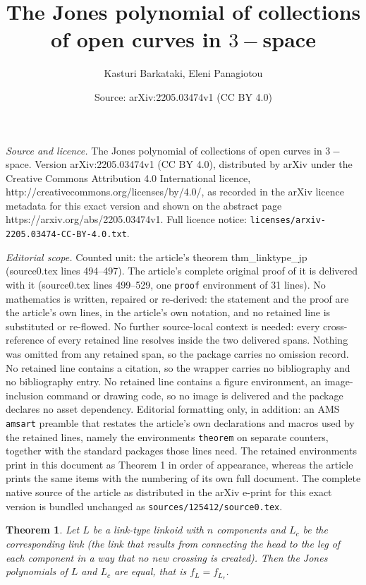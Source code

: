 \documentclass[10pt,a4paper]{amsart}
\title{The Jones polynomial of collections of open curves in $3-$space}
\author{Kasturi Barkataki, Eleni Panagiotou}
\date{Source: arXiv:2205.03474v1 (CC BY 4.0)}
\newtheorem{theorem}{Theorem}
\begin{document}
\maketitle

\noindent\emph{Source and licence.} The Jones polynomial of collections of open curves in $3-$space. Version arXiv:2205.03474v1 (CC BY 4.0), distributed by arXiv under the Creative Commons Attribution 4.0 International licence, http://creativecommons.org/licenses/by/4.0/, as recorded in the arXiv licence metadata for this exact version and shown on the abstract page https://arxiv.org/abs/2205.03474v1. Full licence notice: \texttt{licenses/arxiv-2205.03474-CC-BY-4.0.txt}.\par\smallskip

\noindent\textit{Editorial scope.} Counted unit: the article's theorem thm\_linktype\_jp (source0.tex lines 494--497). The article's complete original proof of it is delivered with it (source0.tex lines 499--529, one \texttt{proof} environment of 31 lines). No mathematics is written, repaired or re-derived: the statement and the proof are the article's own lines, in the article's own notation, and no retained line is substituted or re-flowed.  No further source-local context is needed: every cross-reference of every retained line resolves inside the two delivered spans.  Nothing was omitted from any retained span, so the package carries no omission record.  No retained line contains a citation, so the wrapper carries no bibliography and no bibliography entry.  No retained line contains a figure environment, an image-inclusion command or drawing code, so no image is delivered and the package declares no asset dependency.  Editorial formatting only, in addition: an AMS \texttt{amsart} preamble that restates the article's own declarations and macros used by the retained lines, namely the environments \texttt{theorem} on separate counters, together with the standard packages those lines need.  The retained environments print in this document as Theorem 1 in order of appearance, whereas the article prints the same items with the numbering of its own full document.  The complete native source of the article as distributed in the arXiv e-print for this exact version is bundled unchanged as \texttt{sources/125412/source0.tex}.
\begin{theorem}
\label{thm_linktype_jp}
Let $L$ be a link-type linkoid with $n$ components and $L_c$ be the corresponding link (the link that results from connecting the head to the leg of each component in a way that no new crossing is created). Then the Jones polynomials of $L$ and $L_c$ are equal, that is $f_L = f_{L_c}$.
\end{theorem}
\end{document}
